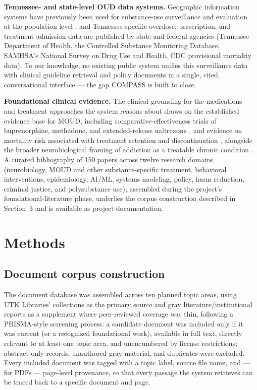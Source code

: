 \documentclass[11pt]{article}
\begin{document}
\textbf{Tennessee- and state-level OUD data systems.} Geographic information systems have previously been used for substance-use surveillance and evaluation at the population level \citep{dasgupta2018}, and Tennessee-specific overdose, prescription, and treatment-admission data are published by state and federal agencies (Tennessee Department of Health, the Controlled Substance Monitoring Database, SAMHSA's National Survey on Drug Use and Health, CDC provisional mortality data). To our knowledge, no existing public system unifies this surveillance data with clinical guideline retrieval and policy documents in a single, cited, conversational interface --- the gap COMPASS is built to close.

\textbf{Foundational clinical evidence.} The clinical grounding for the medications and treatment approaches the system reasons about draws on the established evidence base for MOUD, including comparative-effectiveness trials of buprenorphine, methadone, and extended-release naltrexone \citep{mattick2014,lee2018}, and evidence on mortality risk associated with treatment retention and discontinuation \citep{sordo2017}, alongside the broader neurobiological framing of addiction as a treatable chronic condition \citep{leshner1997,volkow2016}. A curated bibliography of 150 papers across twelve research domains (neurobiology, MOUD and other substance-specific treatment, behavioral interventions, epidemiology, AI/ML, systems modeling, policy, harm reduction, criminal justice, and polysubstance use), assembled during the project's foundational-literature phase, underlies the corpus construction described in Section~3 and is available as project documentation.

\section{Methods}

\subsection{Document corpus construction}

The document database was assembled across ten planned topic areas, using UTK Libraries' collections as the primary source and gray literature/institutional reports as a supplement where peer-reviewed coverage was thin, following a PRISMA-style screening process: a candidate document was included only if it was current (or a recognized foundational work), available in full text, directly relevant to at least one topic area, and unencumbered by license restrictions; abstract-only records, unauthored gray material, and duplicates were excluded. Every included document was tagged with a topic label, source file name, and --- for PDFs --- page-level provenance, so that every passage the system retrieves can be traced back to a specific document and page.
\end{document}
